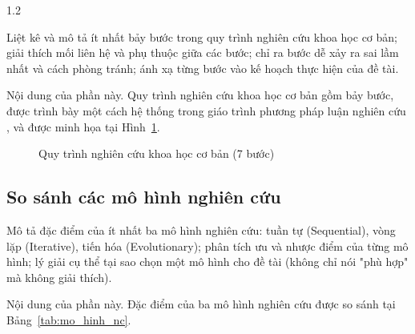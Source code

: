 \begin{spacing}{1.2}
\begin{huongdan}
Liệt kê và mô tả ít nhất bảy bước trong quy trình nghiên cứu khoa học cơ bản; giải thích mối liên hệ và phụ thuộc giữa các bước; chỉ ra bước dễ xảy ra sai lầm nhất và cách phòng tránh; ánh xạ từng bước vào kế hoạch thực hiện của đề tài.
\end{huongdan}

Nội dung của phần này. Quy trình nghiên cứu khoa học cơ bản gồm bảy bước, được trình bày một cách hệ thống trong giáo trình phương pháp luận nghiên cứu \cite{vidu_sach}, và được minh họa tại Hình~\ref{fig:quy_trinh_nc}.

\begin{figure}[htpb]
\centering
{}
\caption{Quy trình nghiên cứu khoa học cơ bản (7 bước)}
\label{fig:quy_trinh_nc}
\end{figure}

\subsection{So sánh các mô hình nghiên cứu}
\label{subsec:so_sanh_mo_hinh}

\begin{huongdan}
Mô tả đặc điểm của ít nhất ba mô hình nghiên cứu: tuần tự (Sequential), vòng lặp (Iterative), tiến hóa (Evolutionary); phân tích ưu và nhược điểm của từng mô hình; lý giải cụ thể tại sao chọn một mô hình cho đề tài (không chỉ nói "phù hợp" mà không giải thích).
\end{huongdan}

Nội dung của phần này. Đặc điểm của ba mô hình nghiên cứu được so sánh tại Bảng~\ref{tab:mo_hinh_nc}.


\end{spacing}
